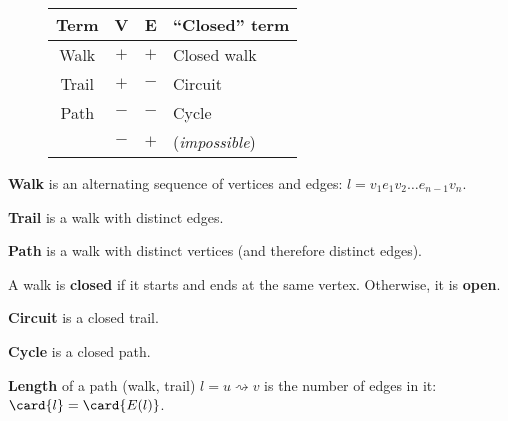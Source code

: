\documentclass[a4paper,10pt]{article}
\begin{document}
\begin{terms}
    \begin{minipage}{\linewidth}

    \setlength{\intextsep}{0pt}%
    \begin{wrapfigure}{r}{0pt}
        \setlength{\tabcolsep}{4pt}%
        \begin{NiceTabular}{ cccl }
            \toprule \RowStyle{\bfseries}
            Term & V& E& \enquote{Closed} term \\
            \midrule
            Walk  & $+$ & $+$ & Closed walk \\
            Trail & $+$ & $-$ & Circuit \\
            Path  & $-$ & $-$ & Cycle \\
                  & $-$ & $+$ & (\emph{impossible}) \\
            \bottomrule
        \end{NiceTabular}
    \end{wrapfigure}

    \item \textbf{Walk} is an alternating sequence of vertices and edges: $l = v_{1} e_{1} v_{2} \dots e_{n-1} v_{n}$.
    \begin{terms}
        \item \textbf{Trail} is a walk with distinct edges.
        \item \textbf{Path} is a walk with distinct vertices (and therefore distinct edges).
        \item A walk is \textbf{closed} if it starts and ends at the same vertex. Otherwise, it is \textbf{open}.
        \item \textbf{Circuit} is a closed trail.
        \item \textbf{Cycle} is a closed path.
    \end{terms}

    \end{minipage}

    \item \textbf{Length} of a path (walk, trail) $l = u \rightsquigarrow v$ is the number of edges in it: $\card{l} = \card{E(l)}$.


\end{terms}
\end{document}
